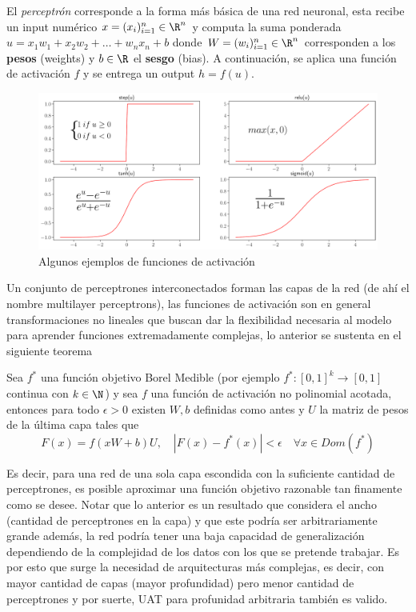 El \textit{perceptrón} corresponde a la forma más básica de una red neuronal, esta recibe un input numérico $x = (x_i)_{i=1}^n \in \R^n$ y computa la suma ponderada $u = x_1w_1 + x_2w_2 + \dots + w_nx_n + b$ donde $W = (w_i)_{i=1}^n \in \R^n$ corresponden a los \textbf{pesos} (weights) y $b \in \R$ el \textbf{sesgo} (bias). 
A continuación, se aplica una función de activación $f$ y se entrega un output $h = f(u)$.  
\begin{figure}[H]
  \centering
  \includegraphics[scale=.3]{img/cap5_activaciones}
  \caption{Algunos ejemplos de funciones de activación}
\end{figure}

Un conjunto de perceptrones interconectados forman las capas de la red (de ahí el nombre multilayer perceptrons), las funciones de activación son en general transformaciones no lineales que buscan dar la flexibilidad necesaria al modelo para aprender funciones extremadamente complejas, lo anterior se sustenta en el siguiente teorema 


\begin{theorem}

	Sea $f^{*}$ una función objetivo Borel Medible (por ejemplo $f^{*}:[0,1]^k \rightarrow [0,1]$ continua con $k \in \N$) y sea $f$ una función de activación no polinomial acotada, entonces para todo $\epsilon > 0$ existen $W,b$ definidas como antes y $U$ la matriz de pesos de la última capa tales que 
	\[
	F(x) = f(xW+b)U, \quad 
	|F(x)-f^{*}(x)|<\epsilon \quad \forall x \in Dom(f^{*}) 
	\]
\end{theorem} 

Es decir, para una red de una sola capa escondida con la suficiente cantidad de perceptrones, es posible aproximar una función objetivo razonable tan finamente como se desee. Notar que lo anterior es un resultado que considera el ancho (cantidad de perceptrones en la capa) y que este podría ser arbitrariamente grande además, la red podría tener una baja capacidad de generalización dependiendo de la complejidad de los datos con los que se pretende trabajar. Es por esto que surge la necesidad de arquitecturas más complejas, es decir, con mayor cantidad de capas (mayor profundidad) pero menor cantidad de perceptrones y por suerte, UAT para profunidad arbitraria también es valido. 

